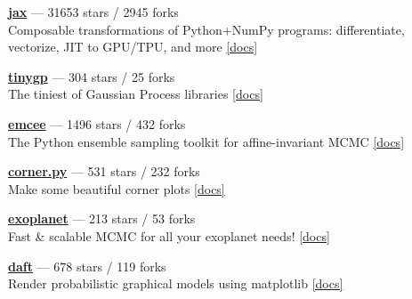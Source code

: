 \item \href{https://github.com/jax-ml/jax}{{\bf jax}} --- 31653 stars / 2945 forks \\
Composable transformations of Python+NumPy programs: differentiate, vectorize, JIT to GPU/TPU, and more \href{http://jax.readthedocs.io/}{[docs]}

\item \href{https://github.com/dfm/tinygp}{{\bf tinygp}} --- 304 stars / 25 forks \\
The tiniest of Gaussian Process libraries \href{https://tinygp.readthedocs.io}{[docs]}

\item \href{https://github.com/dfm/emcee}{{\bf emcee}} --- 1496 stars / 432 forks \\
The Python ensemble sampling toolkit for affine-invariant MCMC \href{https://emcee.readthedocs.io}{[docs]}

\item \href{https://github.com/dfm/corner.py}{{\bf corner.py}} --- 531 stars / 232 forks \\
Make some beautiful corner plots \href{http://corner.readthedocs.io}{[docs]}

\item \href{https://github.com/exoplanet-dev/exoplanet}{{\bf exoplanet}} --- 213 stars / 53 forks \\
Fast {\&} scalable MCMC for all your exoplanet needs!  \href{https://docs.exoplanet.codes}{[docs]}

\item \href{https://github.com/daft-dev/daft}{{\bf daft}} --- 678 stars / 119 forks \\
Render probabilistic graphical models using matplotlib \href{https://docs.daft-pgm.org}{[docs]}